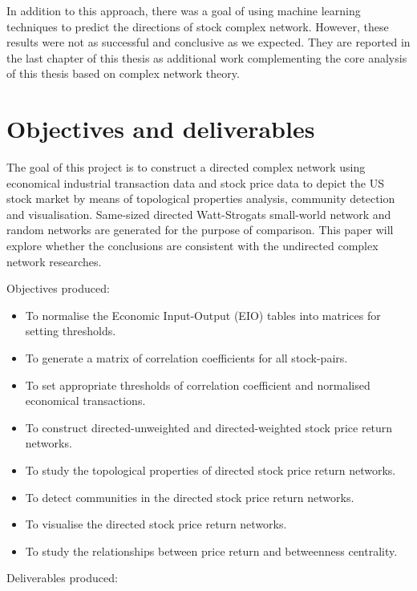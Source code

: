 In addition to this approach, there was a goal of using machine learning techniques to predict the directions of stock complex network. However, these results were not as successful and conclusive as we expected. They are reported in the last chapter of this thesis as additional work complementing the core analysis of this thesis based on complex network theory.


\section{Objectives and deliverables}
The goal of this project is to construct a directed complex network using economical industrial transaction data and stock price data to depict the US stock market by means of topological properties analysis, community detection and visualisation. Same-sized directed Watt-Strogats small-world network and random networks are generated for the purpose of comparison. This paper will explore whether the conclusions are consistent with the undirected complex network researches.

\vline

Objectives produced:

\begin{itemize}
	\item To normalise the Economic Input-Output (EIO) tables into matrices for setting thresholds.
	\item To generate a matrix of correlation coefficients for all stock-pairs.
	\item To set appropriate thresholds of correlation coefficient and normalised economical transactions.
	\item To construct directed-unweighted and directed-weighted stock price return networks.
	\item To study the topological properties of directed stock price return networks.
	\item To detect communities in the directed stock price return networks.
	\item To visualise the directed stock price return networks.
	\item To study the relationships between price return and betweenness centrality.
\end{itemize}

\vline

Deliverables produced:

